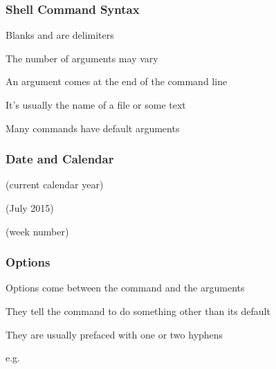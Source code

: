 \documentclass[12pt]{beamer}\usepackage[]{graphicx}\usepackage[]{color}
\begin{document}

\begin{frame}
\frametitle{Shell Command Syntax}


\bigskip
\bi
  \item Blanks and  are delimiters
  \item The number of arguments may vary
  \item An argument comes at the end of the command line
  \item It's usually the name of a file or some text
  \item Many commands have default arguments
\ei
\end{frame}


\begin{frame}
\frametitle{Date and Calendar}
\bi
  \item {}
  \item {} (current calendar year)
  \item {} (July 2015)
  \item {}
  \item {} (week number)
\ei
\end{frame}


\begin{frame}
\frametitle{Options}


\bigskip
\bi
  \item Options come between the command and the arguments
  \item They tell the command to do something other than its default
  \item They are usually prefaced with one or two hyphens
  \item e.g. 
\ei

\end{frame}

\end{document}
